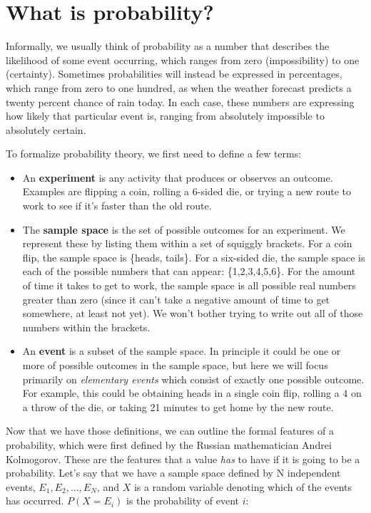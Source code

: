 \documentclass[12pt,]{book}
\providecommand{\tightlist}{%
  \setlength{\itemsep}{0pt}\setlength{\parskip}{0pt}}
\theoremstyle{definition}
\theoremstyle{definition}
\theoremstyle{definition}
\theoremstyle{remark}
\begin{document}
\hypertarget{what-is-probability}{%
\section{What is probability?}\label{what-is-probability}}

Informally, we usually think of probability as a number that describes the likelihood of some event occurring, which ranges from zero (impossibility) to one (certainty). Sometimes probabilities will instead be expressed in percentages, which range from zero to one hundred, as when the weather forecast predicts a twenty percent chance of rain today. In each case, these numbers are expressing how likely that particular event is, ranging from absolutely impossible to absolutely certain.

To formalize probability theory, we first need to define a few terms:

\begin{itemize}
\tightlist
\item
  An \textbf{experiment} is any activity that produces or observes an outcome. Examples are flipping a coin, rolling a 6-sided die, or trying a new route to work to see if it's faster than the old route.
\item
  The \textbf{sample space} is the set of possible outcomes for an experiment. We represent these by listing them within a set of squiggly brackets. For a coin flip, the sample space is \{heads, tails\}. For a six-sided die, the sample space is each of the possible numbers that can appear: \{1,2,3,4,5,6\}. For the amount of time it takes to get to work, the sample space is all possible real numbers greater than zero (since it can't take a negative amount of time to get somewhere, at least not yet). We won't bother trying to write out all of those numbers within the brackets.
\item
  An \textbf{event} is a subset of the sample space. In principle it could be one or more of possible outcomes in the sample space, but here we will focus primarily on \emph{elementary events} which consist of exactly one possible outcome. For example, this could be obtaining heads in a single coin flip, rolling a 4 on a throw of the die, or taking 21 minutes to get home by the new route.
\end{itemize}

Now that we have those definitions, we can outline the formal features of a probability, which were first defined by the Russian mathematician Andrei Kolmogorov. These are the features that a value \emph{has} to have if it is going to be a probability. Let's say that we have a sample space defined by N independent events, \({E_1, E_2, ... , E_N}\), and \(X\) is a random variable denoting which of the events has occurred. \(P(X=E_i)\) is the probability of event \(i\):
\end{document}
